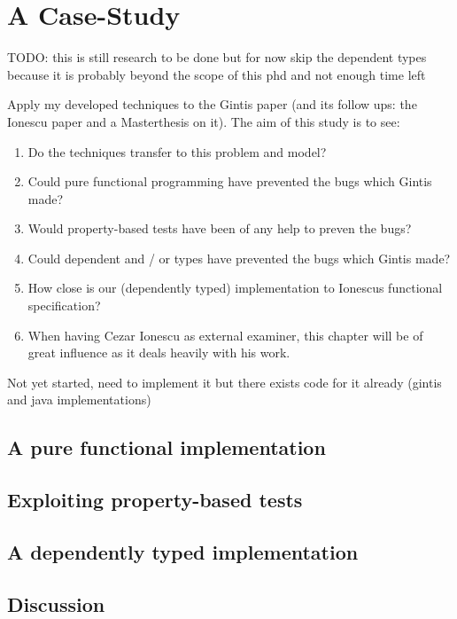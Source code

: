 \chapter{A Case-Study}
\label{ch:case_study}
TODO: this is still research to be done but for now skip the dependent types because it is probably beyond the scope of this phd and not enough time left

Apply my developed techniques to the Gintis paper (and its follow ups: the Ionescu paper \cite{botta_functional_2011} and a Masterthesis \cite{evensen_extensible_2010} on it). The aim of this study is to see:

\begin{enumerate}
	\item Do the techniques transfer to this problem and model? 
	
	\item Could pure functional programming have prevented the bugs which Gintis made? 
	
	\item Would property-based tests have been of any help to preven the bugs?
	
	\item Could dependent and / or types have prevented the bugs which Gintis made? 
	
	\item How close is our (dependently typed) implementation to Ionescus functional specification? 
	
	\item When having Cezar Ionescu as external examiner, this chapter will be of great influence as it deals heavily with his work.
%
\end{enumerate}

Not yet started, need to implement it but there exists code for it already (gintis and java implementations)

%
%
%
%

\section{A pure functional implementation}

\section{Exploiting property-based tests}

\section{A dependently typed implementation}

\section{Discussion}
